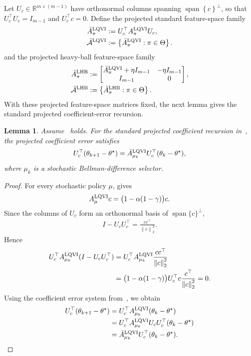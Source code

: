 \documentclass[letterpaper]{article}
\numberwithin{equation}{section}
\newtheorem{lemma}{Lemma}[section]
\newcommand{\R}{\mathbb{R}}
\begin{document}
Let $U_c\in\R^{m\times(m-1)}$ have orthonormal columns spanning
$\operatorname{span}\left\{c\right\}^\perp$, so that $U_c^\top U_c=I_{m-1}$ and $U_c^\top c=0$.
Define the projected standard feature-space family
\begin{align*}
\bar A_\pi^{\rm LQVI}&:=U_c^\top A_\pi^{\rm LQVI}U_c,\\
\bar{\mathcal A}^{\rm LQVI}&:=
  \left\{\bar A_\pi^{\rm LQVI}:\pi\in\Theta\right\}.
\end{align*}
and the projected heavy-ball feature-space family
\begin{align*}
\bar A_\pi^{\rm LHB}&:=
  \begin{bmatrix}
    \bar A_\pi^{\rm LQVI}+\eta I_{m-1}&-\eta I_{m-1}\\
    I_{m-1}&0
  \end{bmatrix},\\
\bar{\mathcal A}^{\rm LHB}&:=
  \left\{\bar A_\pi^{\rm LHB}:\pi\in\Theta\right\}.
\end{align*}
With these projected feature-space matrices fixed, the next lemma gives the
standard projected coefficient-error recursion.
\begin{lemma}
\label{lem:linear-fa-standard-projected-error-system}
Assume~ holds. For the standard projected coefficient
recursion in~, the projected coefficient
error satisfies
\begin{align*}
  U_c^\top(\theta_{k+1}-\theta^\star)
  =\bar A_{\mu_k}^{\rm LQVI}U_c^\top(\theta_k-\theta^\star),
\end{align*}
where $\mu_k$ is a stochastic Bellman-difference selector.
\end{lemma}
\begin{proof}
For every stochastic policy $\mu$,  gives
\begin{align*}
  A_\mu^{\rm LQVI}c=\bigl(1-\alpha(1-\gamma)\bigr)c.
\end{align*}
Since the columns of $U_c$ form an orthonormal basis of
$\operatorname{span}\{c\}^\perp$,
\begin{align*}
  I-U_cU_c^\top=\frac{cc^\top}{\left\lVert c\right\rVert_2^2}.
\end{align*}
Hence
\begin{align*}
  U_c^\top A_{\mu_k}^{\rm LQVI}(I-U_cU_c^\top)
  &=U_c^\top A_{\mu_k}^{\rm LQVI}
    \frac{cc^\top}{\left\lVert c\right\rVert_2^2}\\
  &=\bigl(1-\alpha(1-\gamma)\bigr)
    U_c^\top c\frac{c^\top}{\left\lVert c\right\rVert_2^2}=0.
\end{align*}
Using the coefficient error system from~,
we obtain
\begin{align*}
  U_c^\top(\theta_{k+1}-\theta^\star)
  &=U_c^\top A_{\mu_k}^{\rm LQVI}(\theta_k-\theta^\star)\\
  &=U_c^\top A_{\mu_k}^{\rm LQVI}U_cU_c^\top(\theta_k-\theta^\star)\\
  &=\bar A_{\mu_k}^{\rm LQVI}U_c^\top(\theta_k-\theta^\star).
\end{align*}
\end{proof}
\end{document}
